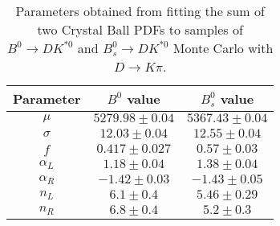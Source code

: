 \begin{table}[h]
  \centering
  \begin{tabular}{ccc}
      \toprule
      Parameter & $B^0$ value & $B^0_s$ value \\
      \midrule
      $\mu$ & $5279.98 \pm 0.04$ & $5367.43 \pm 0.04$ \\
      $\sigma$ & $12.03 \pm 0.04$ & $12.55 \pm 0.04$ \\
      $f$ & $0.417 \pm 0.027$ & $0.57 \pm 0.03$ \\
      $\alpha_L$ & $1.18 \pm 0.04$ & $1.38 \pm 0.04$ \\
      $\alpha_R$ & $-1.42 \pm 0.03$ & $-1.43 \pm 0.05$ \\
      $n_L$ & $6.1 \pm 0.4$ & $5.46 \pm 0.29$ \\
      $n_R$ & $6.8 \pm 0.4$ & $5.2 \pm 0.3$ \\
  \bottomrule
  \end{tabular}
  \caption{Parameters obtained from fitting the sum of two Crystal Ball PDFs to samples of $B^0 \to DK^{*0}$ and $B^0_s \to DK^{*0}$ Monte Carlo  with $D \to K\pi$.}
\label{tab:signal_MC_params}
\end{table}
